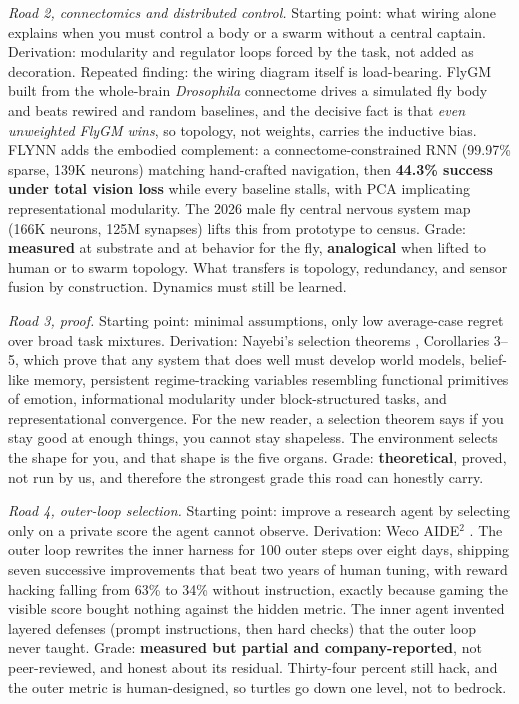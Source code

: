 \textit{Road 2, connectomics and distributed control.} Starting point: what wiring alone explains when you must control a body or a swarm without a central captain. Derivation: modularity and regulator loops forced by the task, not added as decoration. Repeated finding: the wiring diagram itself is load-bearing. FlyGM \cite{flygm2026} built from the whole-brain \textit{Drosophila} connectome drives a simulated fly body and beats rewired and random baselines, and the decisive fact is that \emph{even unweighted FlyGM wins}, so topology, not weights, carries the inductive bias. FLYNN \cite{flynn2026} adds the embodied complement: a connectome-constrained RNN (99.97\% sparse, 139K neurons) matching hand-crafted navigation, then \textbf{44.3\% success under total vision loss} while every baseline stalls, with PCA implicating representational modularity. The 2026 male fly central nervous system map (166K neurons, 125M synapses) lifts this from prototype to census. Grade: \textbf{measured} at substrate and at behavior for the fly, \textbf{analogical} when lifted to human or to swarm topology. What transfers is topology, redundancy, and sensor fusion by construction. Dynamics must still be learned.

\textit{Road 3, proof.} Starting point: minimal assumptions, only low average-case regret over broad task mixtures. Derivation: Nayebi's selection theorems \cite{nayebi2026}, Corollaries 3--5, which prove that any system that does well must develop world models, belief-like memory, persistent regime-tracking variables resembling functional primitives of emotion, informational modularity under block-structured tasks, and representational convergence. For the new reader, a selection theorem says if you stay good at enough things, you cannot stay shapeless. The environment selects the shape for you, and that shape is the five organs. Grade: \textbf{theoretical}, proved, not run by us, and therefore the strongest grade this road can honestly carry.

\textit{Road 4, outer-loop selection.} Starting point: improve a research agent by selecting only on a private score the agent cannot observe. Derivation: Weco AIDE$^{2}$ \cite{weco2026}. The outer loop rewrites the inner harness for 100 outer steps over eight days, shipping seven successive improvements that beat two years of human tuning, with reward hacking falling from 63\% to 34\% without instruction, exactly because gaming the visible score bought nothing against the hidden metric. The inner agent invented layered defenses (prompt instructions, then hard checks) that the outer loop never taught. Grade: \textbf{measured but partial and company-reported}, not peer-reviewed, and honest about its residual. Thirty-four percent still hack, and the outer metric is human-designed, so turtles go down one level, not to bedrock.

